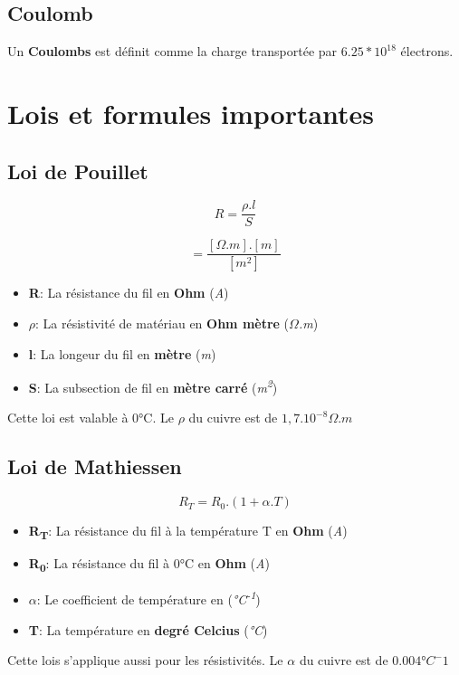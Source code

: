  \subsection{Coulomb}
 Un \textbf{Coulombs} est définit comme la charge transportée par \textbf{$6.25*10^{18}$} électrons.

 \section{Lois et formules importantes}

 \subsection{Loi de Pouillet}

 \begin{equation}
	 R=\frac{\rho.l}{S}
 \end{equation}

 \begin{equation}
	 [\Omega] = \frac{[\Omega.m].[m]}{[m^2]}
 \end{equation}

 \begin{itemize}
	 \item \textbf{R}: La résistance du fil en \textbf{Ohm} (\textit{A})
	 \item \textbf{$\rho$}: La résistivité de matériau en \textbf{Ohm mètre} (\textit{$\Omega$.m})
	 \item \textbf{l}: La longeur du fil en \textbf{mètre} (\textit{m})
	 \item \textbf{S}: La subsection de fil en \textbf{mètre carré} (\textit{m\textsuperscript{2}})
 \end{itemize}
 Cette loi est valable à 0°C. Le $\rho$ du cuivre est de $1,7.10^{-8} \Omega.m$

 \subsection{Loi de Mathiessen}

 \begin{equation}
	 R_{T}=R_{0}.(1+\alpha.T)
 \end{equation}

 \begin{itemize}
	 \item \textbf{R\textsubscript{T}}: La résistance du fil à la température T en \textbf{Ohm} (\textit{A})
	 \item \textbf{R\textsubscript{0}}: La résistance du fil à 0°C en \textbf{Ohm} (\textit{A})
	 \item \textbf{$\alpha$}: Le coefficient de température en (\textit{°C\textsuperscript{-1}})
	 \item \textbf{T}: La température en \textbf{degré Celcius} (\textit{°C})
 \end{itemize}
 Cette lois s'applique aussi pour les résistivités. Le $\alpha$ du cuivre est de $0.004°C^-1$

